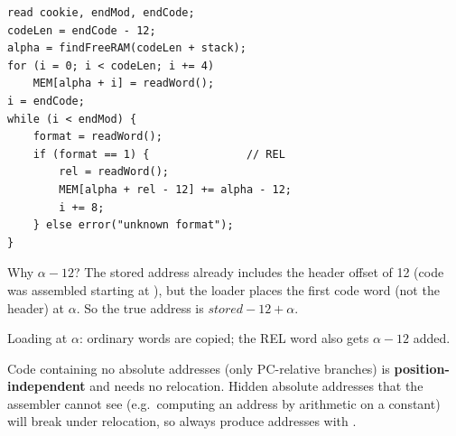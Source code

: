 \begin{lstlisting}[style=c]
read cookie, endMod, endCode;
codeLen = endCode - 12;
alpha = findFreeRAM(codeLen + stack);
for (i = 0; i < codeLen; i += 4)
    MEM[alpha + i] = readWord();
i = endCode;
while (i < endMod) {
    format = readWord();
    if (format == 1) {               // REL
        rel = readWord();
        MEM[alpha + rel - 12] += alpha - 12;
        i += 8;
    } else error("unknown format");
}
\end{lstlisting}

Why $\alpha - 12$? The stored address already includes the header offset of 12 (code was
assembled starting at ), but the loader places the first code word (not the header)
at $\alpha$. So the true address is $\mathit{stored} - 12 + \alpha$.

\begin{center}

\small Loading at $\alpha$: ordinary words are copied; the REL word also gets $\alpha-12$ added.
\end{center}

\begin{important}
Code containing no absolute addresses (only PC-relative branches) is
\textbf{position-independent} and needs no relocation. Hidden absolute addresses that the
assembler cannot see (e.g.\ computing an address by arithmetic on a constant) will break
under relocation, so always produce addresses with .
\end{important}

